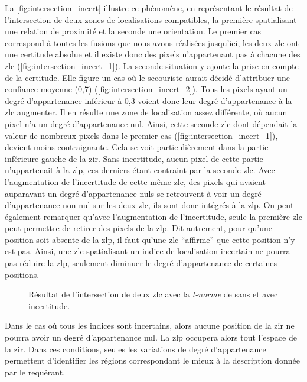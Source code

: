 La \autoref{fig:intersection_incert} illustre ce phénomène, en
représentant le résultat de l'intersection de deux zones de
localisations compatibles, la première spatialisant une relation de
proximité et la seconde une orientation. Le premier cas correspond à
toutes les fusions que nous avons réalisées jusqu'ici, les deux
\ac{zlc} ont une certitude absolue et il existe donc des pixels
n'appartenant pas à chacune des \ac{zlc}
(\ref{fig:intersection_incert_1}). La seconde situation y ajoute la
prise en compte de la certitude. Elle figure un cas où le secouriste
aurait décidé d'attribuer une confiance moyenne (0,7)
(\ref{fig:intersection_incert_2}). Tous les pixels ayant un degré
d'appartenance inférieur à 0,3 voient donc leur degré d'appartenance à
la \ac{zlc} augmenter. Il en résulte une zone de localisation assez
différente, où aucun pixel n'a un degré d'appartenance nul. Ainsi,
cette seconde \ac{zlc} dont dépendait la valeur de nombreux pixels
dans le premier cas (\ref{fig:intersection_incert_1}), devient moins
contraignante. Cela se voit particulièrement dans la partie
inférieure-gauche de la \ac{zir}. Sans incertitude, aucun pixel de
cette partie n’appartenait à la \ac{zlp}, ces derniers étant contraint
par la seconde \ac{zlc}. Avec l'augmentation de l'incertitude de cette
même \ac{zlc}, des pixels qui avaient auparavant un degré
d'appartenance nuls se retrouvent à voir un degré d'appartenance non
nul sur les deux \ac{zlc}, ils sont donc intégrés à la \ac{zlp}. On
peut également remarquer qu'avec l'augmentation de l'incertitude,
seule la première \ac{zlc} peut permettre de retirer des pixels de la
\ac{zlp}. Dit autrement, pour qu'une position soit absente de la
\ac{zlp}, il faut qu'une \ac{zlc} \enquote{affirme} que cette position
n'y est pas. Ainsi, une \ac{zlc} spatialisant un indice de
localisation incertain ne pourra pas réduire la \ac{zlp}, seulement
diminuer le degré d'appartenance de certaines positions.

\begin{figure}
  \centering  \subfloat[\label{fig:intersection_incert_1}]{}

  \subfloat[\label{fig:intersection_incert_2}]{}
  \caption{Résultat de l'intersection de deux \protect\ac{zlc} avec la
    \emph{t-norme} de  sans
    \protect{} et avec
    \protect{} incertitude.}
  \label{fig:intersection_incert}
\end{figure}

Dans le cas où tous les indices sont incertains, alors aucune position
de la \ac{zir} ne pourra avoir un degré d'appartenance nul. La
\ac{zlp} occupera alors tout l'espace de la \ac{zir}. Dans ces
conditions, seules les variations de degré d'appartenance permettent
d'identifier les régions correspondant le mieux à la description
donnée par le requérant.

